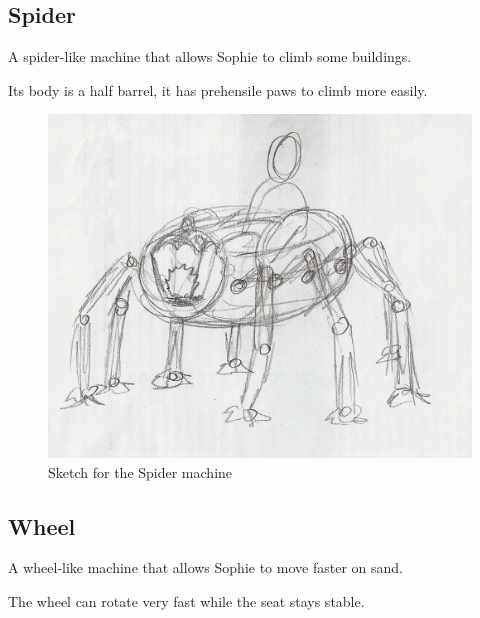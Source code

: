 \pagebreak

\subsection*{Spider}
A spider-like machine that allows Sophie to climb some buildings.

Its body is a half barrel, it has prehensile paws to climb more easily.

\begin{figure}[H]
  \centering
  \includegraphics[width=14cm]{Images/Machines/spider}
  \caption{Sketch for the Spider machine}
\end{figure}

\pagebreak

\subsection*{Wheel}
A wheel-like machine that allows Sophie to move faster on sand.

The wheel can rotate very fast while the seat stays stable.

